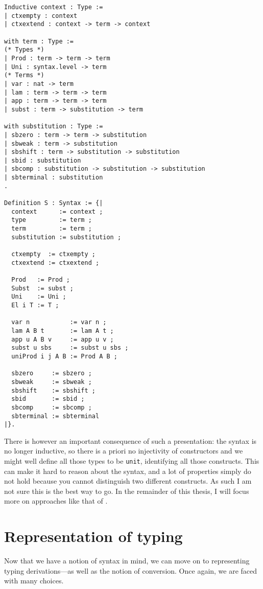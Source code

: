 \begin{verbatim}
Inductive context : Type :=
| ctxempty : context
| ctxextend : context -> term -> context

with term : Type :=
(* Types *)
| Prod : term -> term -> term
| Uni : syntax.level -> term
(* Terms *)
| var : nat -> term
| lam : term -> term -> term
| app : term -> term -> term
| subst : term -> substitution -> term

with substitution : Type :=
| sbzero : term -> term -> substitution
| sbweak : term -> substitution
| sbshift : term -> substitution -> substitution
| sbid : substitution
| sbcomp : substitution -> substitution -> substitution
| sbterminal : substitution
.

Definition S : Syntax := {|
  context      := context ;
  type         := term ;
  term         := term ;
  substitution := substitution ;

  ctxempty  := ctxempty ;
  ctxextend := ctxextend ;

  Prod   := Prod ;
  Subst  := subst ;
  Uni    := Uni ;
  El i T := T ;

  var n           := var n ;
  lam A B t       := lam A t ;
  app u A B v     := app u v ;
  subst u sbs     := subst u sbs ;
  uniProd i j A B := Prod A B ;

  sbzero     := sbzero ;
  sbweak     := sbweak ;
  sbshift    := sbshift ;
  sbid       := sbid ;
  sbcomp     := sbcomp ;
  sbterminal := sbterminal
|}.

\end{verbatim}

There is however an important consequence of such a presentation: the syntax is
no longer inductive, so there is a priori no injectivity of constructors and
we might well define all those types to be \texttt{unit}, identifying
all those constructs.
This can make it hard to reason about the syntax, and a lot of properties simply
do not hold because you cannot distinguish two different constructs.
As such I am not sure this is the best way to go.
In the remainder of this thesis, I will focus more on approaches like that of
\MetaCoq.

\section{Representation of typing}

Now that we have a notion of syntax in mind, we can move on to representing
typing derivations---as well as the notion of conversion.
Once again, we are faced with many choices.

